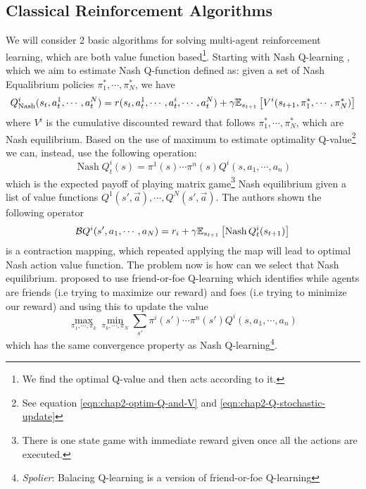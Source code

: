 \subsection{Classical Reinforcement Algorithms}
We will consider 2 basic algorithms for solving multi-agent reinforcement learning, which are both value function based\footnote{We find the optimal Q-value and then acts according to it.}. Starting with Nash Q-learning \cite{hu2003nash}, which we aim to estimate Nash Q-function defined as: given a set of Nash Equalibrium policies $\pi_1^*, \cdots, \pi_N^*$, we have 
\begin{equation}
    Q^i_{\operatorname{Nash}}(s_t, a^1_t, \cdots, a^N_t) = r(s_t, a^1_t, \cdots, a^i_t, \cdots, a^N_t) + \gamma\mathbb{E}_{s_{t+1}}\left[ V^i(s_{t+1}, \pi_1^*, \cdots, \pi_N^*) \right]
\end{equation}
where $V^i$ is the cumulative discounted reward that follows $\pi_1^*, \cdots, \pi_N^*$, which are Nash equilibrium. Based on the use of maximum to estimate optimality Q-value\footnote{See equation \ref{eqn:chap2-optim-Q-and-V} and \ref{eqn:chap2-Q-stochastic-update}} we can, instead, use the following operation:
\begin{equation}
    \operatorname{Nash} Q^i_t(s) = \pi^1(s)\cdots\pi^n(s)Q^i(s, a_1, \cdots, a_n)
\end{equation}
which is the expected payoff of playing matrix game\footnote{There is one state game with immediate reward given once all the actions are executed.} Nash equilibrium given a list of value functions $Q^1(s', \vec{a}), \cdots, Q^N(s', \vec{a})$. The authors shown the following operator 
\begin{equation}
    \mathcal{B} Q^i(s', a_1, \cdots, a_N) = r_i + \gamma \mathbb{E}_{s_{t+1}}\left[ \operatorname{Nash} Q^i_t(s_{t+1})  \right]
\end{equation}
is a contraction mapping, which repeated applying the map will lead to optimal Nash action value function. The problem now is how can we select that Nash equilibrium. \cite{littman2001friend} proposed to use friend-or-foe Q-learning which identifies while agents are friends (i.e trying to maximize our reward) and foes (i.e trying to minimize our reward) and using this to update the value
\begin{equation}
    \max_{\pi_1, \cdots, \pi_k} \min_{\pi_k, \cdots, \pi_N}\sum_{s'} \pi^i(s')\cdots\pi^n(s')Q^i(s, a_1, \cdots, a_n)
\end{equation}
which has the same convergence property as Nash Q-learning\footnote{\textit{Spolier}: Balacing Q-learning is a  version of friend-or-foe Q-learning}. 